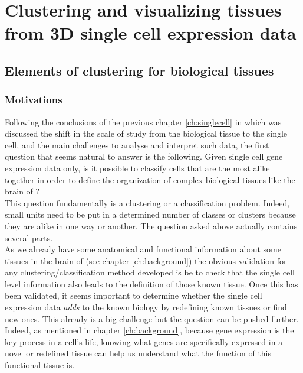 \chapter{Clustering and visualizing tissues from 3D single cell expression data}\label{ch:non_spatial_clustering_visualization} 
\section{Elements of clustering for biological tissues}
	\subsection{Motivations}
	Following the conclusions of the previous chapter \ref{ch:singlecell} in which was discussed the shift in the scale of study from the biological tissue to the single cell, and the main challenges to analyse and interpret such data, the first question that seems natural to answer is the following. Given single cell gene expression data only, is it possible to classify cells that are the most alike together in order to define the organization of complex biological tissues like the brain of \platyfull{}?\\
	
	This question fundamentally is a clustering or a classification problem. Indeed, small units need to be put in a determined number of classes or clusters because they are alike in one way or another. The question asked above actually contains several parts.\\
	
	 As we already have some anatomical and functional information about some tissues in the brain of \platy{} (see chapter \ref{ch:background}) the obvious validation for any clustering/classification method developed is be to check that the single cell level information also leads to the definition of those known tissue. Once this has been validated, it seems important to determine whether the single cell expression data \emph{adds} to the known biology by redefining known tissues or find new ones. This already is a big challenge but the question can be pushed further. Indeed, as mentioned in chapter \ref{ch:background}, because gene expression is the key process in a cell's life, knowing what genes are specifically expressed in a novel or redefined tissue can help us understand what the function of this functional tissue is.

